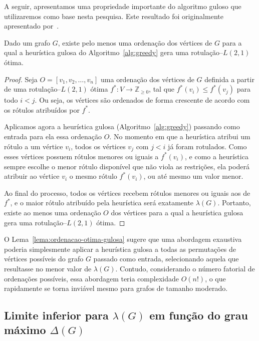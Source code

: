 A seguir, apresentamos uma propriedade importante do algoritmo guloso que utilizaremos como base nesta pesquisa. Este resultado foi originalmente  apresentado por~.

\begin{lema}
\label{lema:ordenacao-otima-gulosa}
Dado um grafo $G$, existe pelo menos uma ordenação dos vértices de $G$ para a qual a heurística gulosa do Algoritmo~\ref{alg:greedy} gera uma rotulação–\(L(2,1)\) ótima.
\end{lema}

\begin{proof}
Seja \( O = [v_1, v_2, \dots, v_n] \) uma ordenação dos vértices de \( G \) definida a partir de uma rotulação–\(L(2,1)\) ótima \( f^*: V \to \mathbb{Z}_{\geq 0} \), tal que \( f^*(v_i) \leq f^*(v_j) \) para todo \( i < j \). Ou seja, os vértices são ordenados de forma crescente de acordo com os rótulos atribuídos por \( f^* \).

Aplicamos agora a heurística gulosa (Algoritmo~\ref{alg:greedy}) passando como entrada para ela essa ordenação \( O \). No momento em que a heurística atribui um rótulo a um vértice \( v_i \), todos os vértices \( v_j \) com \( j < i \) já foram rotulados. Como esses vértices possuem rótulos menores ou iguais a \( f^*(v_i) \), e como a heurística sempre escolhe o menor rótulo disponível que não viola as restrições, ela poderá atribuir ao vértice \( v_i \) o mesmo rótulo \( f^*(v_i) \), ou até mesmo um valor menor.

Ao final do processo, todos os vértices recebem rótulos menores ou iguais aos de \( f^* \), e o maior rótulo atribuído pela heurística será exatamente \( \lambda(G) \). Portanto, existe ao menos uma ordenação \( O \) dos vértices para a qual a heurística gulosa gera uma rotulação–\(L(2,1)\) ótima.
\end{proof}

O Lema~\ref{lema:ordenacao-otima-gulosa} sugere que uma abordagem exaustiva poderia simplesmente aplicar a heurística gulosa a todas as permutações de vértices  possíveis do grafo $G$ passado como entrada, selecionando aquela que resultasse no menor valor de \(\lambda(G)\). Contudo, considerando o número fatorial de ordenações possíveis, essa abordagem teria complexidade \(O(n!)\), o que rapidamente se torna inviável mesmo para grafos de tamanho moderado.

\subsection{Limite inferior para $\lambda(G)$ em função do grau máximo $\Delta(G)$}

